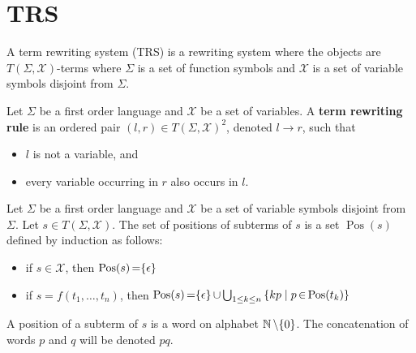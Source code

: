 \documentclass{book}
\begin{document}

\section{TRS}
A term rewriting system (TRS) is a rewriting system where the objects are $T(\Sigma,\mathcal{X})$-terms where $\Sigma$ is a set of function symbols and $\mathcal{X}$ is a set of variable symbols disjoint from $\Sigma$.
  
\begin{definition}
    Let $\Sigma$ be a first order language and $\mathcal{X}$ be a set of variables. A \textbf{term rewriting rule} is an ordered pair $(l,r) \mathop{\in} T(\Sigma, \mathcal{X})^2$, denoted $l \mathop{\to} r$, such that
    \begin{itemize}
      \item $l$ is not a variable, and
      \item every variable occurring in $r$ also occurs in $l$.
    \end{itemize}
  \end{definition}
  
  \begin{definition}
    Let $\Sigma$ be a first order language and $\mathcal{X}$ be a set of variable symbols disjoint from $\Sigma$. Let $s \mathop{\in} T(\Sigma, \mathcal{X})$.
    The set of positions of subterms of $s$ is a set $\operatorname{Pos}(s)$ defined by induction as follows:
    \begin{itemize}
      \item if $s \mathop{\in} \mathcal{X}$, then $\operatorname{Pos}(s) \mathop{=} \{\epsilon\}$
      \item if $s \mathop{=} f(t_1,\hdots,t_n)$, 
            then $\operatorname{Pos}(s) \mathop{=} \{\epsilon\} \mathop{\cup} \bigcup_{1 \leq k \leq n} \left \{kp\mid p \mathop{\in} \operatorname{Pos}(t_k) \right \}$
  \end{itemize}
  A position of a subterm of $s$ is a word on alphabet $\mathbb{N}\mathop{\setminus}\{0\}$. 
    The concatenation of words $p$ and $q$ will be denoted $pq$.
  \end{definition}
\end{document}
